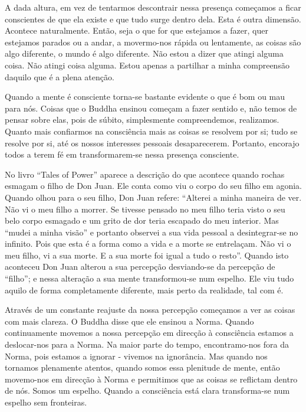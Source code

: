 A dada altura, em vez de tentarmos descontrair nessa presença começamos
a ficar conscientes de que ela existe e que tudo surge dentro dela. Esta
é outra dimensão. Acontece naturalmente. Então, seja o que for que
estejamos a fazer, quer estejamos parados ou a andar, a movermo-nos
rápida ou lentamente, as coisas são algo diferente, o mundo é algo
diferente. Não estou a dizer que atingi alguma coisa. Não atingi coisa
alguma. Estou apenas a partilhar a minha compreensão daquilo que é a
plena atenção.

Quando a mente é consciente torna-se bastante evidente o que é bom ou
mau para nós. Coisas que o Buddha ensinou começam a fazer sentido e, não
temos de pensar sobre elas, pois de súbito, simplesmente compreendemos,
realizamos. Quanto mais confiarmos na consciência mais as coisas se
resolvem por si; tudo se resolve por si, até os nossos interesses
pessoais desaparecerem. Portanto, encorajo todos a terem fé em
transformarem-se nessa presença consciente.

No livro ``Tales of Power'' aparece a descrição do que acontece quando
rochas esmagam o filho de Don Juan. Ele conta como viu o corpo do seu
filho em agonia. Quando olhou para o seu filho, Don Juan refere:
``Alterei a minha maneira de ver. Não vi o meu filho a morrer. Se
tivesse pensado no meu filho teria visto o seu belo corpo esmagado e um
grito de dor teria escapado do meu interior. Mas ``mudei a minha visão''
e portanto observei a sua vida pessoal a desintegrar-se no infinito.
Pois que esta é a forma como a vida e a morte se entrelaçam. Não vi o
meu filho, vi a sua morte. E a sua morte foi igual a tudo o resto''.
Quando isto aconteceu Don Juan alterou a sua percepção desviando-se da
percepção de ``filho''; e nessa alteração a sua mente transformou-se num
espelho. Ele viu tudo aquilo de forma completamente diferente, mais
perto da realidade, tal com é.

Através de um constante reajuste da nossa percepção começamos a ver as
coisas com mais clareza. O Buddha disse que ele ensinou a Norma. Quando
continuamente movemos a nossa percepção em direcção à consciência
estamos a deslocar-nos para a Norma. Na maior parte do tempo,
encontramo-nos fora da Norma, pois estamos a ignorar - vivemos na
ignorância. Mas quando nos tornamos plenamente atentos, quando somos
essa plenitude de mente, então movemo-nos em direcção à Norma e
permitimos que as coisas se reflictam dentro de nós. Somos um espelho.
Quando a consciência está clara transforma-se num espelho sem
fronteiras.

